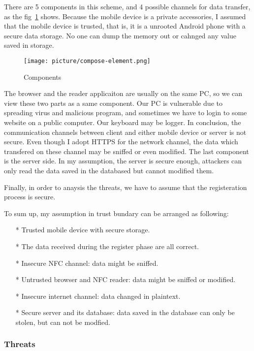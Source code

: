 \begin{CJK}{Bg5}{bsmi}
There are 5 components in this scheme, and 4 possible channels for data transfer, as the fig~\ref{fig:compose-element} shows. Because the mobile device is a private accessories, I assumed that the mobile device is trusted, that is, it is a unrooted Android phone with a secure data storage. No one can dump the memory out or cahnged any value saved in storage. 

\begin{figure}
\centering
\texttt{[image: picture/compose-element.png]}
\caption{Components}
\label{fig:compose-element}
\end{figure}

The browser and the reader applicaiton are usually on the same PC, so we can view these two parts as a same component. Our PC is vulnerable due to spreading virus and malicious program, and sometimes we have to login to some website on a public computer. Our keyboard may be logger. In conclusion, the communication channels between client and either mobile device or server is not secure. Even though I adopt HTTPS for the network channel, the data which transfered on these channel may be sniffed or even modified. The last component is the server side. In my assumption, the server is secure enough, attackers can only read the data saved in the databased but cannot modified them.

Finally, in order to anaysis the threats, we have to assume that the registeration process is secure.

To sum up, my assumption in trust bundary can be arranged as following:
\begin{enumerate}
\item[*] Trusted mobile device with secure storage.
\item[*] The data received during the register phase are all correct.
\item[*] Insecure NFC channel: data might be sniffed.
\item[*] Untrusted browser and NFC reader: data might be sniffed or modified.
\item[*] Insecure internet channel: data changed in plaintext.
\item[*] Secure server and its database: data saved in the database can only be stolen, but can not be modfied.
\end{enumerate}

\subsubsection{Threats}


\end{CJK}
